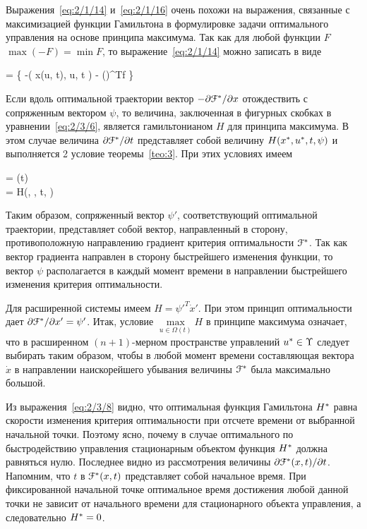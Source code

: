 \br

Выражения~\ref{eq:2/1/14} и~\vref{eq:2/1/16} очень похожи на выражения, связанные с максимизацией функции Гамильтона в формулировке задачи оптимального управления на основе принципа максимума. Так как для любой функции $F$ $\max(-F) = \min F$, то выражение~\ref{eq:2/1/14} можно записать в виде

     =  \Bigl\{ -\funcL\bigl( x(u, t), u, t \bigr) - \biggl(\biggr)^Tf \Bigr\} 
\eeq

Если вдоль оптимальной траектории вектор $-\partial {    \mathcal{F}  ^{*}  } / \partial {x}$ отождествить с сопряженным вектором $\psi$, то величина, заключенная в фигурных скобках в уравнении~\ref{eq:2/3/6}, является гамильтонианом $H$ для принципа максимума. В этом случае величина $\partial {    \mathcal{F}  ^{*}  } / \partial {t}$ представляет собой величину $H(x^{*}, u^{*}, t, \psi)$ и выполняется 2 условие теоремы~\vref{teo:3}. При этих условиях имеем

\beqarr
    	 = \psi(t) \text{;} \\
    	 = \funcH \eqdef H(\optX, \optU, t, \psi)
\eeqarr

Таким образом, сопряженный вектор $\psi'$, соответствующий оптимальной траектории, представляет собой вектор, направленный в сторону, противоположную направлению градиент критерия оптимальности $\mathcal{F}^{*}$. Так как вектор градиента направлен в сторону быстрейшего изменения функции, то вектор $\psi$ располагается в каждый момент времени в направлении быстрейшего изменения критерия оптимальности.

Для расширенной системы имеем $H = \psi'^T\dot{x}'$. При этом принцип оптимальности дает $\partial {    \mathcal{F}  ^{*}  } / \partial {x'} = \psi'$. Итак, условие $\max\limits_{u \in \Omega(t)} H$ в принципе максимума означает, что в расширенном $(n+1)$-мерном пространстве управлений $u^{*} \in \Upsilon$ следует выбирать таким образом, чтобы в любой момент времени составляющая вектора $\dot{x}$ в направлении наискорейшего убывания величины $\mathcal{F}^{*}$ была максимально большой.

Из выражения~\ref{eq:2/3/8} видно, что оптимальная функция Гамильтона $H^{*}$ равна скорости изменения критерия оптимальности при отсчете времени от выбранной начальной точки. Поэтому ясно, почему в случае оптимального по быстродействию управления стационарным объектом функция $H^{*}$ должна равняться нулю. Последнее видно из рассмотрения величины $\partial {    \mathcal{F}  ^{*}  (x, t)} / \partial {t}$. Напомним, что $t$ в $\mathcal{F}^{*}(x, t)$ представляет собой начальное время. При фиксированной начальной точке оптимальное время достижения любой данной точки не зависит от начального времени для стационарного объекта управления, а следовательно $H^{*} = 0$.

